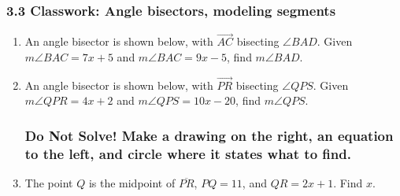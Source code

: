 \documentclass[12pt, twoside]{article}
\begin{document}
  \subsubsection*{3.3 Classwork: Angle bisectors, modeling segments}
  \begin{enumerate}

  \item An angle bisector is shown below, with $\overrightarrow{AC}$ bisecting $\angle BAD$. Given $m\angle BAC = 7x+5$ and $m\angle BAC = 9x-5$, find $m\angle BAD$.
    \begin{flushright}
    \end{flushright} \vspace{3cm}

    \item An angle bisector is shown below, with $\overrightarrow{PR}$ bisecting $\angle QPS$. Given $m\angle QPR = 4x+2$ and $m\angle QPS = 10x-20$, find $m\angle QPS$.
    \begin{flushright}
    \end{flushright}

\newpage   
  \subsubsection*{Do Not Solve! Make a drawing on the right, an equation to the left, and circle where it states what to find.}
  \vspace{0.5cm}

\item The point $Q$ is the midpoint of $\overline{PR}$, $PQ=11$, and $QR=2x+1$. Find ${x}$.
\vspace{4cm}


\end{enumerate}
\end{document}

